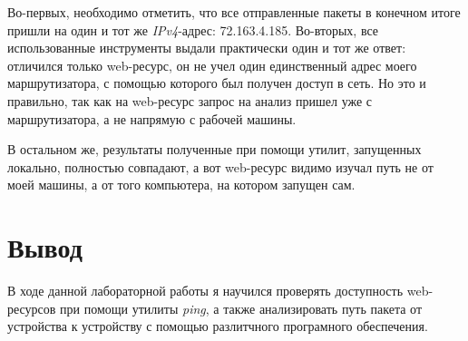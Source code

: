 \documentclass[a4paper]{article}
\begin{document}
  Во-первых, необходимо отметить, что все отправленные пакеты в конечном итоге пришли на один
  и тот же \textit{IPv4}-адрес: 72.163.4.185. Во-вторых, все использованные инструменты выдали 
  практически один и тот же ответ: отличился только web-ресурс, он не учел один единственный адрес моего маршрутизатора,
  с помощью которого был получен доступ в сеть. Но это и правильно, так как на web-ресурс запрос на анализ пришел уже
  с маршрутизатора, а не напрямую с рабочей машины.

  В остальном же, результаты полученные при помощи утилит, запущенных локально, полностью совпадают,
  а вот web-ресурс видимо  изучал путь не от моей машины, а от того компьютера, на котором запущен сам.

  \newpage
  \section{Вывод}

  В ходе данной лабораторной работы я научился проверять доступность web-ресурсов при помощи утилиты \textit{ping},
  а также анализировать путь пакета от устройства к устройству с помощью разлитчного програмного обеспечения.
  
\end{document}
